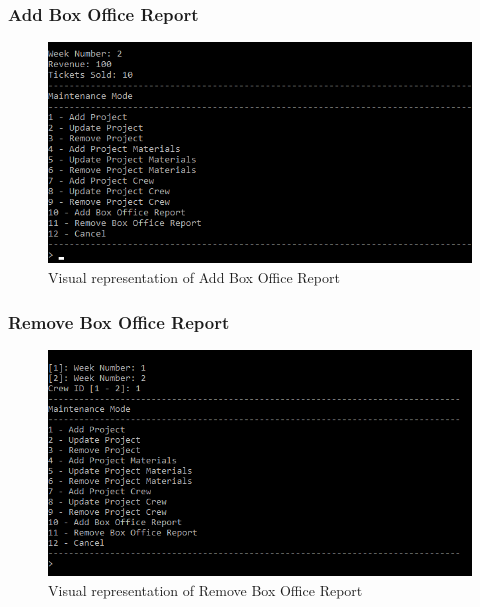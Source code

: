 \documentclass[
  english,
  a4paper,
,tablecaptionabove
]{scrartcl}
\begin{document}
\newpage

\hypertarget{add-box-office-report}{%
\subsubsection{Add Box Office Report}\label{add-box-office-report}}

\begin{figure}
\centering
\includegraphics{images/ui-screenshots/add-box-office.png}
\caption{Visual representation of Add Box Office Report}
\end{figure}

\newpage

\hypertarget{remove-box-office-report}{%
\subsubsection{Remove Box Office
Report}\label{remove-box-office-report}}

\begin{figure}
\centering
\includegraphics{images/ui-screenshots/remove-box-office.png}
\caption{Visual representation of Remove Box Office Report}
\end{figure}
\end{document}
